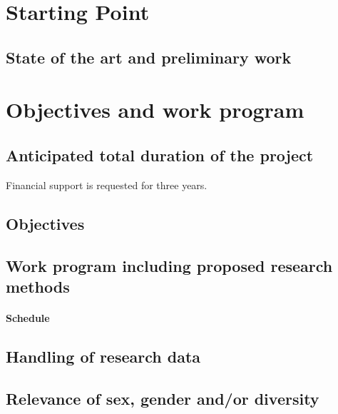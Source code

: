 \documentclass{scrartcl}
\begin{document}
\makeprojecttitle


\section{Starting Point}
\label{sec:work-report}

\subsection*{State of the art and preliminary work}

\section{Objectives and work program}

\subsection{Anticipated total duration of the project}
Financial support is requested for three years.

\subsection{Objectives}

\subsection{Work program including proposed research methods}

\hrulefill
{}
\label{wp:1}


\hrulefill
{}
\label{wp:2}
\hrulefill

\paragraph*{Schedule}

\subsection{Handling of research data}

\subsection{Relevance of sex, gender and/or diversity}
\end{document}
